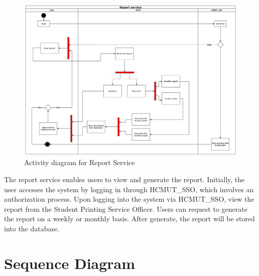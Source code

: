 \begin{figure}[H]
\centering
  \includegraphics[max width=0.9\linewidth,origin = c]{chapters/4. system-modeling/activity/activity_report.png}
  \caption{Activity diagram for Report Service}%
\end{figure}

The report service enables users to view and generate the report. Initially, the user accesses the system by logging in through HCMUT\_SSO, which involves an authorization process. Upon logging into the system via HCMUT\_SSO, view the report from the Student Printing Service Officer. Users can request to generate the report on a weekly or monthly basis. After generate, the report will be stored into the database.












\section{Sequence Diagram}
